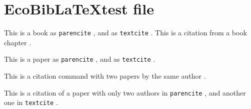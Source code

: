 \documentclass[11pt]{article}
\begin{document}
 
\section*{EcoBib\LaTeX test file}

This is a book as \texttt{parencite} \parencite{Darwin1859}, and as \texttt{textcite}
\textcite{Elton1927}. This is a citation from a book chapter \parencite{Dunne2006}.

This is a paper as \texttt{parencite} \parencite{Holt1996}, and as \texttt{textcite}
\textcite{Anderson2011}.

This is a citation command with two papers by the same author \parencite{Tuomisto2010,Tuomisto2011}.

This is a citation of a paper with only two authors in \texttt{parencite}
\parencite{PoisotBJLS2010}, and another one in \texttt{textcite} \textcite{Yang2012}.

\printbibliography
\end{document}
